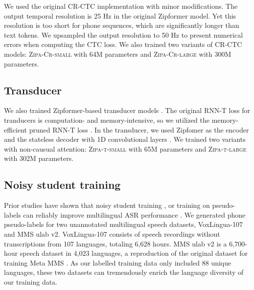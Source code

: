 \documentclass[11pt]{article}
\begin{document}
We used the original CR-CTC implementation \cite{yao2025crctc} with minor modifications. The output temporal resolution is 25 Hz in the original Zipformer model. Yet this resolution is too short for phone sequences, which are significantly longer than text tokens. We upsampled the output resolution to 50 Hz to present numerical errors when computing the CTC loss. We also trained two variants of CR-CTC models: \textsc{Zipa-Cr-small} with 64M parameters and \textsc{Zipa-Cr-large} with 300M parameters. 




\subsection{Transducer}
We also trained Zipformer-based transducer models \citep{yao2023zipformer}. The original RNN-T loss for tranducers is computation- and memory-intensive, so we utilized the memory-efficient pruned RNN-T loss \cite{kuang22_interspeech}. In the transducer, we used Zipfomer as the encoder and the stateless decoder with 1D convolutional layers \cite{ghodsi2020rnn}. We trained two variants with non-causual attention: \textsc{Zipa-t-small} with 65M parameters and \textsc{Zipa-t-large} with 302M parameters. 

\subsection{Noisy student training}
Prior studies have shown that noisy student training \cite{park20d_interspeech}, or training on pseudo-labels can reliably improve multilingual ASR performance \cite{hwang2022large,hwang22c_interspeech,ramirez2024anatomy}. We generated phone pseudo-labels for two unannotated multilingual speech datasets, VoxLingua-107 and MMS ulab v2. VoxLingua-107 \cite{valk2021voxlingua107} consists of speech recordings without transcriptions from 107 languages, totaling 6,628 hours. MMS ulab v2 \cite{chen-etal-2024-towards-robust} is a 6,700-hour speech dataset in 4,023 languages, a reproduction of the original dataset for training Meta MMS \cite{pratap2024scaling}. As our labelled training data only included 88 unique languages, these two datasets can tremendously enrich the language diversity of our training data. 
\end{document}
